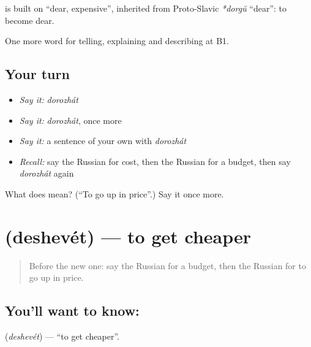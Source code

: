 \begin{cousinweb}
\textbf{} is built on \emph{} \textquotedblleft{}dear, expensive\textquotedblright{}, inherited from Proto-Slavic \emph{*dorgŭ} \textquotedblleft{}dear\textquotedblright{}: to become dear.
\end{cousinweb}

\begin{grammarlens}[title={What you've built}]
One more word for telling, explaining and describing at B1.
\end{grammarlens}

\subsection*{Your turn}
\begin{itemize}
\raggedright
  \item \emph{Say it:} \emph{dorozhát}
  \item \emph{Say it:} \emph{dorozhát}, once more
  \item \emph{Say it:} a sentence of your own with \emph{dorozhát}
  \item \emph{Recall:} say the Russian for cost, then the Russian for a budget, then say \emph{dorozhát} again
\end{itemize}

\begin{tcolorbox}[breakable,colback=teal!4,colframe=teal!35!black,title={Before you move on}]
What does  mean? (\textquotedblleft{}To go up in price\textquotedblright{}.) Say it once more.
\end{tcolorbox}
\section[\texorpdfstring{\ru{дешеветь} (deshevét)}{дешеветь (deshevét)}]{ (deshevét) — to get cheaper}

\label{lesson:RU-C396-deshevet}



\begin{quote}
Before the new one: say the Russian for a budget, then the Russian for to go up in price.
\end{quote}

\subsection*{You'll want to know: }
\textbf{} (\emph{deshevét}) — \textquotedblleft{}to get cheaper\textquotedblright{}.


